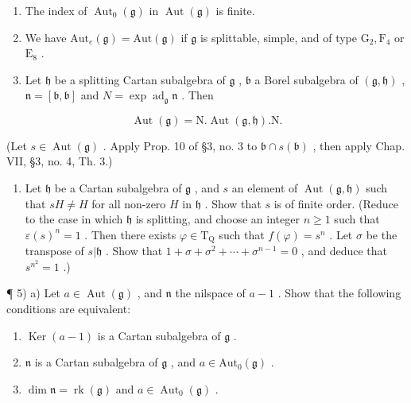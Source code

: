 
\begin{enumerate}
\def\labelenumi{\arabic{enumi})}
\item
  The index of \(\operatorname{Aut}_{0}(\mathfrak{g})\) in \(\operatorname{Aut}(\mathfrak{g})\) is finite.
\item
  We have \(\mathrm{Aut}_e(\mathfrak{g}) = \mathrm{Aut}(\mathfrak{g})\) if \(\mathfrak{g}\) is splittable, simple, and of type \(\mathrm{G}_2, \mathrm{F}_4\) or \(\mathrm{E}_8\) .
\item
  Let \(\mathfrak{h}\) be a splitting Cartan subalgebra of \(\mathfrak{g}\) , \(\mathfrak{b}\) a Borel subalgebra of \((\mathfrak{g},\mathfrak{h})\) , \(\mathfrak{n} = [\mathfrak{b},\mathfrak{b}]\) and \(N = \exp \operatorname{ad}_{\mathfrak{g}}\mathfrak{n}\) . Then
\end{enumerate}

\[
\operatorname{Aut} (\mathfrak {g}) = \mathrm{N}. \operatorname{Aut} (\mathfrak {g}, \mathfrak {h}). \mathrm{N}.
\]

(Let \(s \in \operatorname{Aut}(\mathfrak{g})\) . Apply Prop. 10 of §3, no. 3 to \(\mathfrak{b} \cap s(\mathfrak{b})\) , then apply Chap. VII, §3, no. 4, Th. 3.)

\begin{enumerate}
\def\labelenumi{\arabic{enumi})}
\setcounter{enumi}{3}
\tightlist
\item
  Let \(\mathfrak{h}\) be a Cartan subalgebra of \(\mathfrak{g}\) , and \(s\) an element of \(\operatorname{Aut}(\mathfrak{g},\mathfrak{h})\) such that \(sH \neq H\) for all non-zero \(H\) in \(\mathfrak{h}\) . Show that \(s\) is of finite order. (Reduce to the case in which \(\mathfrak{h}\) is splitting, and choose an integer \(n \geq 1\) such that \(\varepsilon(s)^n = 1\) . Then there exists \(\varphi \in \mathrm{T}_{\mathrm{Q}}\) such that \(f(\varphi) = s^n\) . Let \(\sigma\) be the transpose of \(s|\mathfrak{h}\) . Show that \(1 + \sigma + \sigma^2 + \cdots + \sigma^{n-1} = 0\) , and deduce that \(s^{n^2} = 1\) .)
\end{enumerate}

¶ 5) a) Let \(a \in \operatorname{Aut}(\mathfrak{g})\) , and \(\mathfrak{n}\) the nilspace of \(a - 1\) . Show that the following conditions are equivalent:

\begin{enumerate}
\def\labelenumi{(\roman{enumi})}
\item
  \(\operatorname{Ker}(a - 1)\) is a Cartan subalgebra of \(\mathfrak{g}\) .
\item
  \(\mathfrak{n}\) is a Cartan subalgebra of \(\mathfrak{g}\) , and \(a\in \mathrm{Aut}_0(\mathfrak{g})\) .
\item
  \(\dim\mathfrak{n}=\operatorname{rk}(\mathfrak{g})\) and \(a\in\operatorname{Aut}_{0}(\mathfrak{g})\) .
\end{enumerate}

